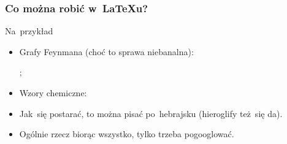 \documentclass[10pt,t]{beamer}
\begin{document}
\begin{frame}
  \frametitle{Co można robić w~\LaTeX u?}


  Na~przykład
  \begin{itemize}
    \RaggedRight

  \item Grafy Feynmana (choć to sprawa niebanalna):

    \begin{center}
      ;
    \end{center}

  \item Wzory chemiczne:

    \begin{center}


    \end{center}

  \item Jak~się postarać, to można pisać po~hebrajsku
    (hieroglify też~się da).

  \item Ogólnie rzecz biorąc wszystko, tylko trzeba
    {\color{purple} pogooglować}.

  \end{itemize}

\end{frame}
\end{document}
